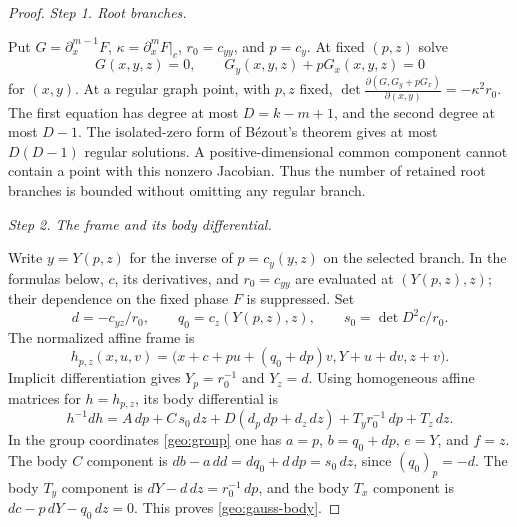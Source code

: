 \documentclass[11pt]{amsart}
\theoremstyle{definition}
\theoremstyle{remark}
\numberwithin{equation}{section}
\begin{document}
\begin{proof}
\par\medskip\noindent\textit{Step 1. Root branches.}\par\nobreak\smallskip

Put $G=\partial_x^{m-1}F$, $\kappa=\partial_x^mF|_c$, $r_0=c_{yy}$, and $p=c_y$. At fixed $(p,z)$ solve
\begin{equation}\label{geo:gauss-equations}
G(x,y,z)=0,\qquad G_y(x,y,z)+pG_x(x,y,z)=0
\end{equation}
for $(x,y)$. At a regular graph point, with $p,z$ fixed, $\det\frac{\partial(G,G_y+pG_x)}{\partial(x,y)}=-\kappa^2r_0$. The first equation has degree at most $D=k-m+1$, and the second degree at most $D-1$. The isolated-zero form of B\'ezout's theorem \cite[Corollary 1.3]{low:roots} gives at most $D(D-1)$ regular solutions. A positive-dimensional common component cannot contain a point with this nonzero Jacobian. Thus the number of retained root branches is bounded without omitting any regular branch.

\par\medskip\noindent\textit{Step 2. The frame and its body differential.}\par\nobreak\smallskip

Write $y=Y(p,z)$ for the inverse of $p=c_y(y,z)$ on the selected branch. In the formulas below, $c$, its derivatives, and $r_0=c_{yy}$ are evaluated at $(Y(p,z),z)$; their dependence on the fixed phase $F$ is suppressed. Set
\[
d=-c_{yz}/r_0,\qquad q_0=c_z(Y(p,z),z),\qquad s_0=\det D^2c/r_0.
\]
The normalized affine frame is
\begin{equation}\label{geo:gauss-frame}
h_{p,z}(x,u,v)=\bigl(x+c+pu+(q_0+dp)v, Y+u+dv, z+v\bigr).
\end{equation}
Implicit differentiation gives $Y_p=r_0^{-1}$ and $Y_z=d$. Using homogeneous affine matrices for $h=h_{p,z}$, its body differential is
\begin{equation}\label{geo:gauss-body}
h^{-1}dh=A\,dp+C\,s_0\,dz+D(d_p\,dp+d_z\,dz)+T_y r_0^{-1}\,dp+T_z\,dz.
\end{equation}
In the group coordinates \eqref{geo:group} one has $a=p$, $b=q_0+dp$, $e=Y$, and $f=z$. The body $C$ component is $db-a\,dd=dq_0+d\,dp=s_0\,dz$, since $(q_0)_p=-d$. The body $T_y$ component is $dY-d\,dz=r_0^{-1}\,dp$, and the body $T_x$ component is $dc-p\,dY-q_0\,dz=0$. This proves \eqref{geo:gauss-body}.


\end{proof}
\end{document}
